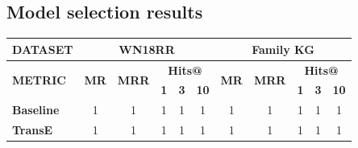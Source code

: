 \subsection{Model selection results}
\begin{table}[]
\centering
\begin{tabular}{|l||ccccc||ccccc|}
\hline
{\textbf{DATASET}}                 & \multicolumn{5}{c||}{\textbf{WN18RR}}                                                                                                                                               & \multicolumn{5}{c|}{\textbf{Family KG}}                                                                                                                            \\ \hline
\multirow{2}{*}{{\textbf{METRIC}}} & \multicolumn{1}{c|}{\multirow{2}{*}{\textbf{MR}}} & \multicolumn{1}{c|}{\multirow{2}{*}{\textbf{MRR}}} & \multicolumn{3}{c||}{\textbf{Hits@}}                                       & \multicolumn{1}{c|}{\multirow{2}{*}{\textbf{MR}}} & \multicolumn{1}{c|}{\multirow{2}{*}{\textbf{MRR}}} & \multicolumn{3}{c|}{\textbf{Hits@}}                                       \\ \cline{4-6} \cline{9-11} 
                                       & \multicolumn{1}{c|}{}                             & \multicolumn{1}{c|}{}                              & \multicolumn{1}{l|}{\textbf{1}} & \multicolumn{1}{l|}{\textbf{3}} & \multicolumn{1}{l||}{\textbf{10}} & \multicolumn{1}{c|}{}                             & \multicolumn{1}{c|}{}                              & \multicolumn{1}{l|}{\textbf{1}} & \multicolumn{1}{l|}{\textbf{3}} & \multicolumn{1}{l|}{\textbf{10}} \\ \hline
\textbf{Baseline}                      & 1                                                 & 1                                                  & 1                      & 1                      & 1                       & 1                                                 & 1                                                  & 1                      & 1                      & 1                       \\ 
\textbf{TransE}                        & 1                                                  & 1                                                  & 1                      & 1                      & 1                       & 1                                                 & 1                                                  & 1                      & 1                      & 1                       \\ 

\end{tabular}
\end{table}
